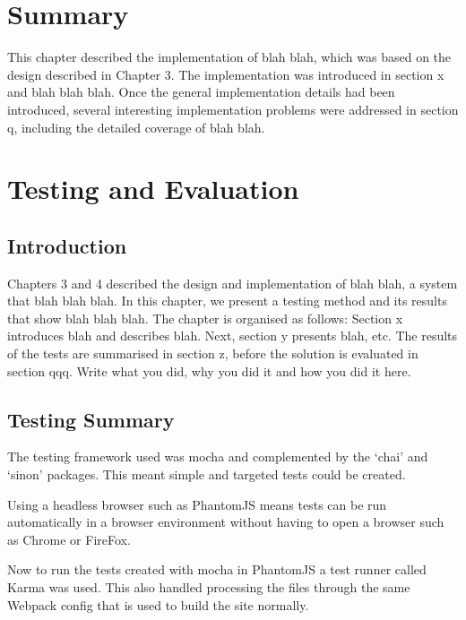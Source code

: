 \section{Summary} \label{s-i--summary}

This chapter described the implementation of blah blah, which was based on the design described in Chapter 3. The implementation was introduced in section x and blah blah blah. Once the general implementation details had been introduced, several interesting implementation problems were addressed in section q, including the detailed coverage of blah blah.

\section{Testing and Evaluation} \label{s-i--testing-and-evaluation}

\subsection{Introduction} \label{s-i--t-a-e--i}

Chapters 3 and 4 described the design and implementation of blah blah, a system that blah blah blah.  In this chapter, we present a testing method and its results that show blah blah blah.  The chapter is organised as follows:  Section x introduces blah and describes blah.  Next, section y presents blah, etc.
The results of the tests are summarised in section z, before the solution is evaluated in section qqq.
Write what you did, why you did it and how you did it here.

\subsection{Testing Summary} \label{s-i--testing-summary}

The testing framework used was mocha and complemented by the `chai' and `sinon' packages. This meant simple and targeted tests could be created. \cite{mocha}

Using a headless browser such as PhantomJS means tests can be run automatically in a browser environment without having to open a browser such as Chrome or FireFox. \cite{phantomjs}

Now to run the tests created with mocha in PhantomJS a test runner called Karma was used. \cite{karma} This also handled processing the files through the same Webpack config that is used to build the site normally.

